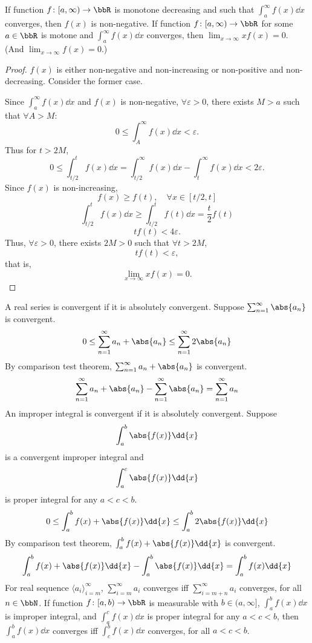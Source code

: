 \epr
If function $f\colon[a,\infty)\to\bbR$ is monotone decreasing and such that $\int_a^{\infty}f(x)\dd{x}$ converges, then $f(x)$ is non-negative.
If function $f\colon[a,\infty)\to\bbR$ for some $a\in\bbR$ is motone and $\int_a^{\infty}f(x)\dd{x}$ converges, then $\lim_{x\to\infty}xf(x)=0$. (And $\lim_{x\to\infty}f(x)=0$.)
\begin{proof}
$f(x)$ is either non-negative and non-increasing or non-positive and non-decreasing. Consider the former case.

Since $\int_a^{\infty}f(x)\dd{x}$ and $f(x)$ is non-negative, $\forall\varepsilon>0$, there exists $M>a$ such that $\forall A>M$:
\[0\leq\int_A^{\infty}f(x)\dd{x}<\varepsilon.\]
Thus for $t>2M$,
\[0\leq\int_{t/2}^tf(x)\dd{x}=\int_{t/2}^{\infty}f(x)\dd{x}-\int_t^{\infty}f(x)\dd{x}<2\varepsilon.\]
Since $f(x)$ is non-increasing,
\[f(x)\geq f(t),\quad\forall x\in[t/2,t]\]
\[\int_{t/2}^tf(x)\dd{x}\geq\int_{t/2}^tf(t)\dd{x}=\frac{t}{2}f(t)\]
\[tf(t)<4\varepsilon.\]
Thus, $\forall\varepsilon>0$, there exists $2M>0$ such that $\forall t>2M$,
\[tf(t)<\varepsilon,\]
that is,
\[\lim_{x\to\infty}xf(x)=0.\]
\end{proof}
A real series is convergent if it is absolutely convergent.
\bpr
Suppose $\sum_{n=1}^{\infty}\abs{a_n}$ is convergent.
\[0\leq\sum_{n=1}^{\infty}a_n+\abs{a_n}\leq\sum_{n=1}^{\infty}2\abs{a_n}\]
By comparison test theorem, $\sum_{n=1}^{\infty}a_n+\abs{a_n}$ is convergent.
\[\sum_{n=1}^{\infty}a_n+\abs{a_n}-\sum_{n=1}^{\infty}\abs{a_n}=\sum_{n=1}^{\infty}a_n\]
\epr
{}
An improper integral is convergent if it is absolutely convergent.
\bpr
Suppose
\[\int_a^b\abs{f(x)}\dd{x}\]
is a convergent improper integral and
\[\int_a^c\abs{f(x)}\dd{x}\]
is proper integral for any $a<c<b$.
\[0\leq\int_a^bf(x)+\abs{f(x)}\dd{x}\leq\int_a^b2\abs{f(x)}\dd{x}\]
By comparison test theorem, $\int_a^bf(x)+\abs{f(x)}\dd{x}$ is convergent.
\[\int_a^bf(x)+\abs{f(x)}\dd{x}-\int_a^b\abs{f(x)}\dd{x}=\int_a^bf(x)\dd{x}\]
\epr
{}
For real sequence $\langle a_i\rangle_{i=m}^{\infty}$, $\sum_{i=m}^{\infty}a_i$ converges iff $\sum_{i=m+n}^{\infty}a_i$ converges, for all $n\in\bbN$.
If function $f\colon [a,b)\to\bbR$ is measurable with $b\in(a,\infty]$, $\int_a^bf(x)\dd{x}$ is improper integral, and $\int_a^cf(x)\dd{x}$ is proper integral for any $a<c<b$, then $\int_a^bf(x)\dd{x}$ converges iff $\int_c^bf(x)\dd{x}$ converges, for all $a<c<b$.
